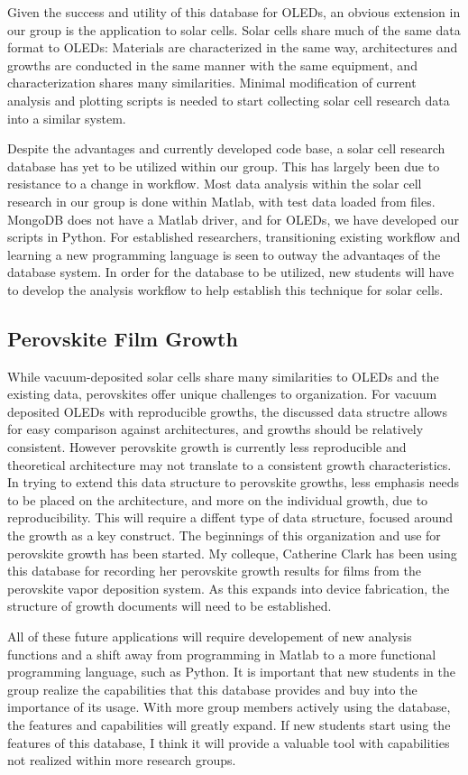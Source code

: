 \documentclass[../thesis.tex]{subfiles}
\begin{document}
Given the success and utility of this database for OLEDs, an obvious extension in our group is the application to solar cells.
Solar cells share much of the same data format to OLEDs: Materials are characterized in the same way, architectures and growths are conducted in the same manner with the same equipment, and characterization shares many similarities.
Minimal modification of current analysis and plotting scripts is needed to start collecting solar cell research data into a similar system.

Despite the advantages and currently developed code base, a solar cell research database has yet to be utilized within our group.
This has largely been due to resistance to a change in workflow.
Most data analysis within the solar cell research in our group is done within Matlab, with test data loaded from files.
MongoDB does not have a Matlab driver, and for OLEDs, we have developed our scripts in Python.
For established researchers, transitioning existing workflow and learning a new programming language is seen to outway the advantaqes of the database system.
In order for the database to be utilized, new students will have to develop the analysis workflow to help establish this technique for solar cells.

\subsection{Perovskite Film Growth}

While vacuum-deposited solar cells share many similarities to OLEDs and the existing data, perovskites offer unique challenges to organization.
For vacuum deposited OLEDs with reproducible growths, the discussed data structre allows for easy comparison against architectures, and growths should be relatively consistent.
However perovskite growth is currently less reproducible and theoretical architecture may not translate to a consistent growth characteristics.  
In trying to extend this data structure to perovskite growths, less emphasis needs to be placed on the architecture, and more on the individual growth, due to reproducibility.
This will require a diffent type of data structure, focused around the growth as a key construct.  
The beginnings of this organization and use for perovskite growth has been started.
My colleque, Catherine Clark has been using this database for recording her perovskite growth results for films from the perovskite vapor deposition system.
As this expands into device fabrication, the structure of growth documents will need to be established.

All of these future applications will require developement of new analysis functions and a shift away from programming in Matlab to a more functional programming language, such as Python.
It is important that new students in the group realize the capabilities that this database provides and buy into the importance of its usage.
With more group members actively using the database, the features and capabilities will greatly expand.
If new students start using the features of this database, I think it will provide a valuable tool with capabilities not realized within more research groups.



\end{document}
